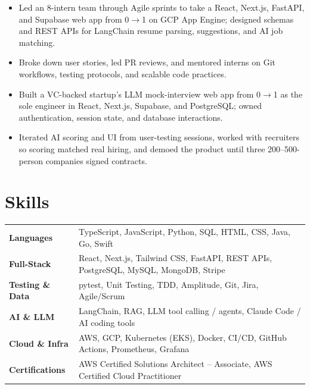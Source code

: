 \documentclass[11pt, letterpaper]{article}
\begin{document}
\vspace{1pt}
\begin{itemize}
  \item Led an 8-intern team through Agile sprints to take a React, Next.js, FastAPI, and Supabase web app from 0$\to$1 on GCP App Engine; designed schemas and REST APIs for LangChain resume parsing, suggestions, and AI job matching.
  \item Broke down user stories, led PR reviews, and mentored interns on Git workflows, testing protocols, and scalable code practices.
\end{itemize}

\vspace{1pt}
\begin{itemize}
  \item Built a VC-backed startup's LLM mock-interview web app from 0$\to$1 as the sole engineer in React, Next.js, Supabase, and PostgreSQL; owned authentication, session state, and database interactions.
  \item Iterated AI scoring and UI from user-testing sessions, worked with recruiters so scoring matched real hiring, and demoed the product until three 200--500-person companies signed contracts.
\end{itemize}

\section{Skills}
\begin{tabularx}{\textwidth}{@{}l @{\hspace{7pt}} >{\raggedright\arraybackslash}X@{}}
  \textbf{Languages} & TypeScript, JavaScript, Python, SQL, HTML, CSS, Java, Go, Swift \\[1pt]
  \textbf{Full-Stack} & React, Next.js, Tailwind CSS, FastAPI, REST APIs, PostgreSQL, MySQL, MongoDB, Stripe \\[1pt]
  \textbf{Testing \& Data} & pytest, Unit Testing, TDD, Amplitude, Git, Jira, Agile/Scrum \\[1pt]
  \textbf{AI \& LLM} & LangChain, RAG, LLM tool calling / agents, Claude Code / AI coding tools \\[1pt]
  \textbf{Cloud \& Infra} & AWS, GCP, Kubernetes (EKS), Docker, CI/CD, GitHub Actions, Prometheus, Grafana \\[1pt]
  \textbf{Certifications} & AWS Certified Solutions Architect -- Associate, AWS Certified Cloud Practitioner \\
\end{tabularx}
\end{document}
